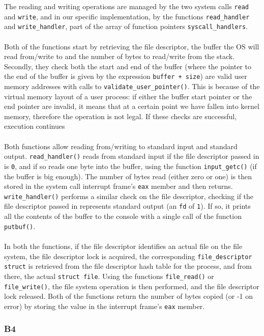 \documentclass[a4wide, 11pt]{article}
\newcommand{\tx}{\texttt}
\begin{document}
The reading and writing operations are managed by the two system calls \tx{read} and \tx{write}, and in our specific implementation, by the functions \tx{read\_handler} and \tx{write\_handler}, part of the array of function pointers \tx{syscall\_handlers}. 
\\\\
Both of the functions start by retrieving the file descriptor, the buffer the OS will read from/write to and the number of bytes to read/write from the stack. Secondly, they check both the start and end of the buffer (where the pointer to the end of the buffer is given by the expression \tx{buffer + size}) are valid user memory addresses with calls to \tx{validate\_user\_pointer()}. This is because of the virtual memory layout of a user process: if either the buffer start pointer or the end pointer are invalid, it means that at a certain point we have fallen into kernel memory, therefore the operation is not legal. If these checks are successful, execution continues
\\\\
Both functions allow reading from/writing to standard input and standard output. \tx{read\_handler()} reads from standard input if the file descriptor passed in is \tx{0}, and if so reads one byte into the buffer, using the function \tx{input\_getc()} (if the buffer is big enough). The number of bytes read (either zero or one) is then stored in the system call interrupt frame's \tx{eax} member and then returns. \tx{write\_handler()} performs a similar check on the file descriptor, checking if the file descriptor passed in represents standard output (an \tx{fd} of \tx{1}). If so, it prints all the contents of the buffer to the console with a single call of the function \tx{putbuf()}.
\\\\
In both the functions, if the file descriptor identifies an actual file on the file system, the file descriptor lock is acquired, the corresponding \tx{file\_descriptor struct} is retrieved from the file descriptor hash table for the process, and from there, the actual \tx{struct file}. Using the functions \tx{file\_read()} or \tx{file\_write()}, the file system operation is then performed, and the file descriptor lock released. Both of the functions return the number of bytes copied (or -1 on error) by storing the value in the interrupt frame's \tx{eax} member.

\subsubsection{B4}
\end{document}
